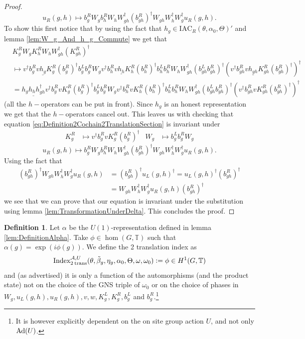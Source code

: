 \documentclass[12pt,a4paper,twoside]{article}
\newcommand{\IAC}{\textrm{IAC}}
\newcommand{\defeq}{\vcentcolon=}
\let\originalleft\left
\let\originalright\right
\renewcommand{\left}{\mathopen{}\mathclose\bgroup\originalleft}
\renewcommand{\right}{\aftergroup\egroup\originalright}
\newcommand{\TT}{\mathbb T}
\renewcommand{\AA}{\mathcal A}
\newcommand{\Ad}[1]{\textrm{Ad}\left(#1\right)}
\theoremstyle{definition}
\newtheorem{definition}[theorem]{Definition}
\numberwithin{equation}{section}
\begin{document}
\begin{proof}
\begin{equation}
		u_R(g,h)\mapsto b_g^R W_g b_h^R W_h W_{gh}^\dagger (b_{gh}^R)^\dagger W_{gh}W_h^\dagger W_g^\dagger u_R(g,h).
	\end{equation}
	To show this first notice that by using the fact that $h_g\in\IAC_R(\theta,\alpha_0,\Theta)'$ and lemma \ref{lem:W_g_And_h_g_Commute} we get that
	\begin{align}
		&K_g^R W_g K_h^R W_ hW_{gh}^\dagger(K_{gh}^R)^\dagger\\
		&\mapsto v^\dagger b_g^R v \underline{h_g} K_g^R (b_g^R)^\dagger b_g^Lb_g^RW_g v^\dagger b_h^R v \underline{h_h} K_h^R (b_h^R)^\dagger b_h^Lb_h^RW_h W_{gh}^\dagger (b_{gh}^Lb_{gh}^R)^\dagger (v^\dagger b_{gh}^R v \underline{h_{gh}} K_{gh}^R (b_{gh}^R)^\dagger)^\dagger\\
		&=\underline{h_gh_hh_{gh}^\dagger} v^\dagger b_g^R v  K_g^R (b_g^R)^\dagger b_g^Lb_g^RW_g v^\dagger b_h^R v  K_h^R (b_h^R)^\dagger b_h^Lb_h^RW_h W_{gh}^\dagger (b_{gh}^Lb_{gh}^R)^\dagger (v^\dagger b_{gh}^R v  K_{gh}^R (b_{gh}^R)^\dagger)^\dagger
	\end{align}
	(all the $h-$operators can be put in front). Since $h_g$ is an honest representation we get that the $h-$operators cancel out. This leaves us with checking that equation \eqref{eq:Definition2Cochain2TranslationSection} is invariant under
	\begin{align}
		K_g^R&\mapsto v^\dagger b_g^R v K_g^R (b_g^R)^\dagger&W_g&\mapsto b_g^Lb_g^RW_g
	\end{align}
	\begin{equation}
		u_R(g,h)\mapsto b_g^R W_g b_h^R W_h W_{gh}^\dagger (b_{gh}^R)^\dagger W_{gh}W_h^\dagger W_g^\dagger u_R(g,h).
	\end{equation}
	Using the fact that
	\begin{align}
		(b_{gh}^R)^\dagger W_{gh}W_h^\dagger W_g^\dagger u_R(g,h)&=(b_{gh}^R)^\dagger u_L(g,h)^\dagger=u_L(g,h)^\dagger(b_{gh}^R)^\dagger\\
		&=W_{gh}W_h^\dagger W_g^\dagger u_R(g,h) (b_{gh}^R)^\dagger
	\end{align}
	we see that we can prove that our equation is invariant under the substitution using lemma \ref{lem:TransformationUnderDelta}. This concludes the proof.
\end{proof}
\begin{definition}
	Let $\alpha$ be the $U(1)$-representation defined in lemma \ref{lem:DefinitionAlpha}. Take $\phi\in\hom(G,\TT)$ such that $\alpha(g)=\exp(i\phi(g))$. We define the 2 translation index as
	\begin{equation}
		\textrm{Index}_{2\:\text{trans}}^{\AA,U}(\theta,\tilde{\beta}_g,\eta_g,\alpha_0,\Theta,\omega,\omega_0)\defeq \phi\in H^1(G,\TT)
	\end{equation}
	and (as advertised) it is only a function of the automorphisms (and the product state) not on the choice of the GNS triple of $\omega_0$ or on the choice of phases in $W_g,u_L(g,h),u_R(g,h),v,w,K^L_g,K^R_g,b^L_g$ and $b^R_g$.\footnote{It is however explicitly dependent on the on site group action $U$, and not only $\Ad{U}$.}
\end{definition}
\end{document}
